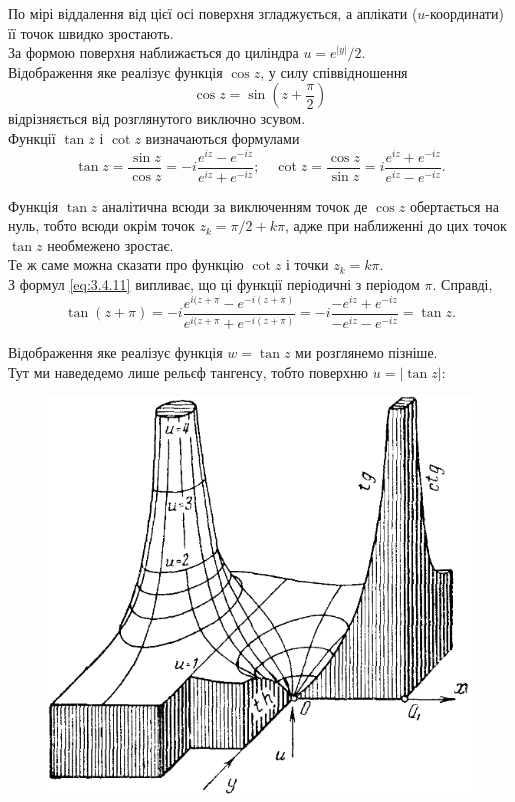 По мірі віддалення від цієї осі поверхня згладжується, а аплікати ($u$-координати) її точок швидко зростають. \\

За формою поверхня наближається до циліндра $u = e^{|y|} / 2$. \\

Відображення яке реалізує функція $\cos z$, у силу співвідношення
\begin{equation}
	\label{eq:3.4.10}
	\cos z = \sin \left( z + \dfrac \pi 2 \right)
\end{equation}
відрізняється від розглянутого виключно зсувом. \\

Функції $\tan z$ і $\cot z$ визначаються формулами
\begin{equation}
	\label{eq:3.4.11}
	\tan z = \dfrac{\sin z}{\cos z} = - i \dfrac{e^{i z} - e^{-i z}}{e^{i z} + e^{-i z}}; \quad \cot z = \dfrac{\cos z}{\sin z} = i \dfrac{e^{i z} + e^{-i z}}{e^{i z} - e^{-i z}}.
\end{equation}

Функція $\tan z$ аналітична всюди за виключенням точок де $\cos z$ обертається на нуль, тобто всюди окрім точок $z_k = \pi/2 + k \pi$, адже при наближенні до цих точок $\tan z$ необмежено зростає. \\

Те ж саме можна сказати про функцію $\cot z$ і точки $z_k = k \pi$. \\

З формул \eqref{eq:3.4.11} випливає, що ці функції періодичні з періодом $\pi$. Справді,
\begin{equation}
	\label{eq:3.4.12}
	\tan (z + \pi) = -i \dfrac{e^{i(z + \pi} - e^{-i(z + \pi)}}{e^{i(z + \pi} + e^{-i(z + \pi)}} = -i \dfrac{-e^{i z} + e^{-i z}}{-e^{i z} - e^{-i z}} = \tan z.
\end{equation}

Відображення яке реалізує функція $w = \tan z$ ми розглянемо пізніше. \\

Тут ми наведедемо лише рельєф тангенсу, тобто поверхню $u = |\tan z|$:

\begin{figure}[H]
	\centering
	\includegraphics[width=.6\linewidth]{mal-17.png}
\end{figure}

